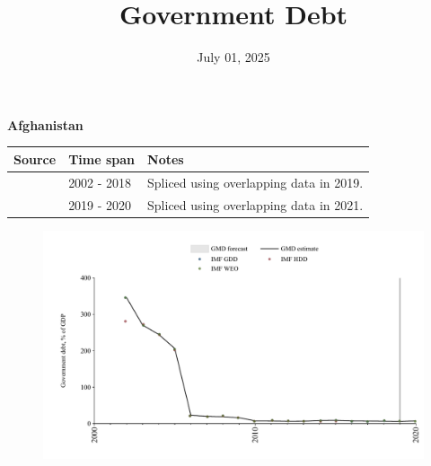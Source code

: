 \documentclass[12pt,a4paper,landscape]{article}
\begin{document}
\title{\Large Government Debt}
\date{July 01, 2025}
\maketitle
\thispagestyle{empty}

\clearpage
\setcounter{page}{1}
\hypersetup{colorlinks=true,linkcolor=blue,linktoc=all}
\label{toc}
\tableofcontents
\thispagestyle{empty}
\setcounter{page}{3}
\begin{adjustbox}{max totalsize={\paperwidth}{\paperheight},center}
\begin{minipage}[t][\textheight][t]{\textwidth}
\vspace*{0.5cm}
{}
\begin{center}
{\Large\bfseries Afghanistan}
\end{center}
\vspace{0.5cm}
\begin{table}[H]
\centering
\small
\begin{tabular}{|l|l|l|}
\hline
\textbf{Source} & \textbf{Time span} & \textbf{Notes} \\
\hline
\rowcolor{white}\cite{IMF_GDD}& 2002 - 2018 &Spliced using overlapping data in 2019.\\
\rowcolor{lightgray}\cite{IMF_WEO}& 2019 - 2020 &Spliced using overlapping data in 2021.\\
\hline
\end{tabular}
\end{table}
\begin{figure}[H]
\centering
\includegraphics[width=\textwidth,height=0.6\textheight,keepaspectratio]{graphs/AFG_govdebt_GDP.pdf}
\end{figure}
\end{minipage}
\end{adjustbox}
\end{document}
